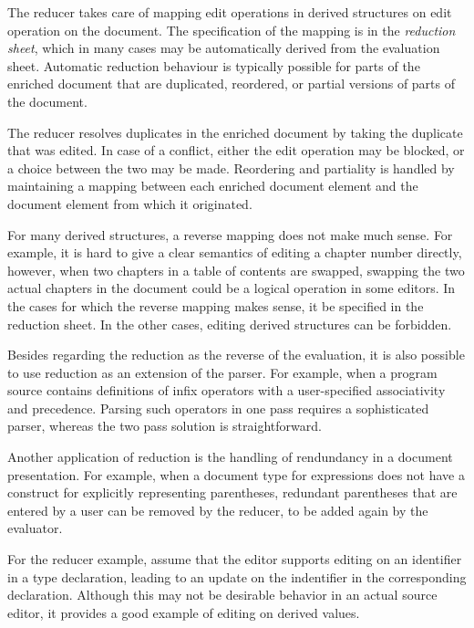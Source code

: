 The reducer takes care of mapping edit operations in derived structures on edit operation on the document. The specification of the mapping is in the {\em reduction sheet}, which in many cases may be automatically derived from the evaluation sheet. Automatic reduction behaviour is typically possible for parts of the enriched document that are duplicated, reordered, or partial versions of parts of the document. 

The reducer resolves duplicates in the enriched document by taking the duplicate that was edited. In case of a conflict, either the edit operation may be blocked, or a choice between the two may be made. Reordering and partiality  is handled by maintaining a mapping between each enriched document element and the document element from which it originated.

For many derived structures, a reverse mapping does not make much sense. For example, it is hard to give a clear semantics of editing a chapter number directly, however, when two chapters in a table of contents are swapped, swapping the two actual chapters in the document could be a logical operation in some editors. In the cases for which the reverse mapping makes sense, it be specified in the reduction sheet. In the other cases, editing derived structures can be forbidden.

Besides regarding the reduction as the reverse of the evaluation, it is also possible to use reduction as an extension of the parser. For example, when a program source contains definitions of infix operators with a user-specified associativity and precedence. Parsing such operators in one pass requires a sophisticated parser, whereas the two pass solution is straightforward.

Another application of reduction is the handling of rendundancy in a document presentation. For example, when a document type for expressions does not have a construct for explicitly representing parentheses, redundant parentheses that are entered by a user can be removed by the reducer, to be added again by the evaluator. 


For the reducer example, assume that the editor supports editing on an identifier in a type declaration, leading to an update on the indentifier in the corresponding declaration. Although this may not be desirable behavior in an actual source editor, it provides a good example of editing on derived values.

